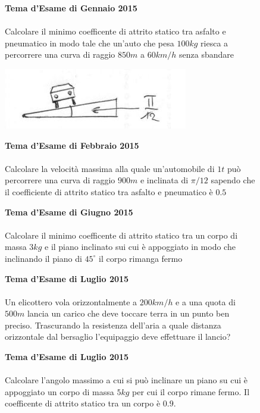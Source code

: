 
\begin{figure}[h!]
\textbf{Tema d'Esame di Gennaio 2015}\\ \\
Calcolare il minimo coefficente di attrito statico tra asfalto e pneumatico in modo tale che un'auto che pesa $100kg$ riesca a percorrere una curva di raggio $850m$ a $60km/h$ senza sbandare
\begin{center}
		\includegraphics[scale=0.8]{ES1/FEB012015.jpg}
	\end{center}
\end{figure}

\begin{figure}[h!]
\textbf{Tema d'Esame di Febbraio 2015}\\ \\
 Calcolare la velocità massima alla quale un'automobile di $1 t$ può percorrere una curva di
raggio $900 m$ e inclinata di $\pi/12$ sapendo che il coefficiente di attrito statico tra asfalto e
pneumatico è $0.5$
\end{figure}

\begin{figure}[h!]
\textbf{Tema d'Esame di Giugno 2015}\\ \\
Calcolare il minimo coefficente di attrito statico tra un corpo di massa $3kg$ e il piano inclinato sui cui è appoggiato in modo che inclinando il piano di $45^{\circ}$ il corpo rimanga fermo
\end{figure}

\begin{figure}[h!]
\textbf{Tema d'Esame di Luglio 2015}\\ \\
Un elicottero vola orizzontalmente a $200km/h$ e a una quota di $500m$ lancia un carico che deve toccare terra in un punto ben preciso. Trascurando la resistenza dell'aria a quale distanza orizzontale dal bersaglio l'equipaggio deve effettuare il lancio?
\end{figure}

\begin{figure}[h!]
\textbf{Tema d'Esame di Luglio 2015}\\ \\
Calcolare l'angolo massimo a cui si può inclinare un piano su cui è appoggiato un corpo di massa $5kg$ per cui il corpo rimane fermo. Il coefficente di attrito statico tra un corpo è $0.9$.
\end{figure}


